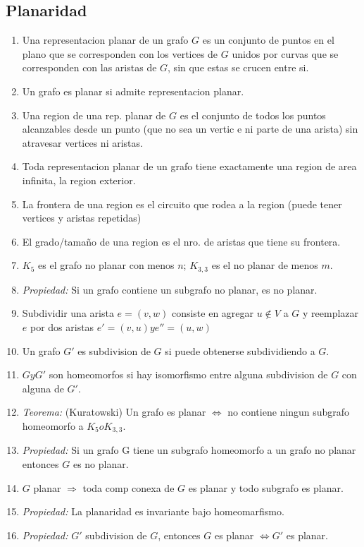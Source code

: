 \documentclass[a4paper, 11pt]{article}
\begin{document}
\subsection{Planaridad}
\begin{enumerate}
\item Una representacion planar de un grafo $G$ es un conjunto de puntos en el plano que se corresponden con los vertices de $G$ unidos por curvas que se corresponden con las aristas de $G$, sin que estas se crucen entre si.
\item Un grafo es planar si admite representacion planar.
\item Una region de una rep. planar de $G$ es el conjunto de todos los puntos alcanzables desde un punto (que no sea un vertic e ni parte de una arista) sin atravesar vertices ni aristas.
\item Toda representacion planar de un grafo tiene exactamente una region de area infinita, la region exterior.
\item La frontera de una region es el circuito que rodea a la region (puede tener vertices y aristas repetidas)
\item El grado/tamaño de una region es el nro. de aristas que tiene su frontera.
\item $K_{5}$ es el grafo no planar con menos $n$; $K_{3,3}$ es el no planar de menos $m$.
\item \textit{Propiedad:} Si un grafo contiene un subgrafo no planar, es no planar.
\item Subdividir una arista $e=(v,w)$ consiste en agregar $u \notin V$ a $G$ y reemplazar $e$ por dos aristas $e'=(v,u) y e''=(u,w)$
\item Un grafo $G'$ es subdivision de $G$ si puede obtenerse subdividiendo a $G$.
\item $G y G'$ son homeomorfos si hay isomorfismo entre alguna subdivision de $G$ con alguna de $G'$.
\item \textit{Teorema:} (Kuratowski) Un grafo es planar $\iff$ no contiene ningun subgrafo homeomorfo a $K_{5} o K_{3,3}$.
\item \textit{Propiedad:} Si un grafo G tiene un subgrafo homeomorfo a un grafo no planar entonces $G$ es no planar.
\item $G$ planar $\Rightarrow$ toda comp conexa de $G$ es planar y todo subgrafo es planar.
\item \textit{Propiedad:} La planaridad es invariante bajo homeomarfismo.
\item \textit{Propiedad:} $G'$ subdivision de $G$, entonces $G$ es planar $\iff G'$ es planar.

\end{enumerate}
\end{document}
